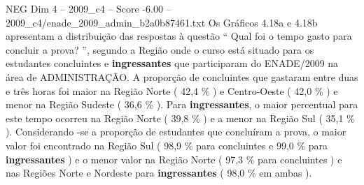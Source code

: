 \begin{textsample}{NEG Dim 4 – 2009\_c4 – Score -6.00 – 2009\_c4/enade\_2009\_admin\_b2a0b87461.txt}
Os Gráficos 4.18a e 4.18b apresentam a distribuição das respostas à questão “ Qual foi o tempo gasto para concluir a prova? ”, segundo a Região onde o curso está situado para os estudantes concluintes e \textbf{ingressantes} que participaram do ENADE/2009 na área de ADMINISTRAÇÃO.
A proporção de concluintes que gastaram entre duas e três horas foi maior na Região Norte ( 42,4 \% ) e Centro-Oeste ( 42,0 \% ) e menor na Região Sudeste ( 36,6 \% ).
Para \textbf{ingressantes}, o maior percentual para este tempo ocorreu na Região Norte ( 39,8 \% ) e a menor na Região Sul ( 35,1 \% ).
Considerando -se a proporção de estudantes que concluíram a prova, o maior valor foi encontrado na Região Sul ( 98,9 \% para concluintes e 99,0 \% para \textbf{ingressantes} ) e o menor valor na Região Norte ( 97,3 \% para concluintes ) e nas Regiões Norte e Nordeste para \textbf{ingressantes} ( 98,0 \% em ambas ).

\end{textsample}
